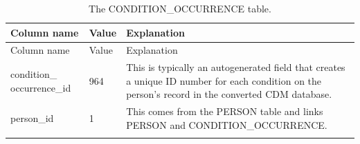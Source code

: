 \documentclass[11pt]{book}
\begin{document}
\begin{longtable}[]{@{}lll@{}}
\caption{\label{tab:conditionOccurrence} The CONDITION\_OCCURRENCE
table.}\tabularnewline
\toprule
\begin{minipage}[b]{0.28\columnwidth}\raggedright\strut
Column name\strut
\end{minipage} & \begin{minipage}[b]{0.16\columnwidth}\raggedright\strut
Value\strut
\end{minipage} & \begin{minipage}[b]{0.48\columnwidth}\raggedright\strut
Explanation\strut
\end{minipage}\tabularnewline
\midrule
\endfirsthead
\toprule
\begin{minipage}[b]{0.28\columnwidth}\raggedright\strut
Column name\strut
\end{minipage} & \begin{minipage}[b]{0.16\columnwidth}\raggedright\strut
Value\strut
\end{minipage} & \begin{minipage}[b]{0.48\columnwidth}\raggedright\strut
Explanation\strut
\end{minipage}\tabularnewline
\midrule
\endhead
\begin{minipage}[t]{0.28\columnwidth}\raggedright\strut
condition\_ occurrence\_id\strut
\end{minipage} & \begin{minipage}[t]{0.16\columnwidth}\raggedright\strut
964\strut
\end{minipage} & \begin{minipage}[t]{0.48\columnwidth}\raggedright\strut
This is typically an autogenerated field that creates a unique ID number
for each condition on the person's record in the converted CDM
database.\strut
\end{minipage}\tabularnewline
\begin{minipage}[t]{0.28\columnwidth}\raggedright\strut
person\_id\strut
\end{minipage} & \begin{minipage}[t]{0.16\columnwidth}\raggedright\strut
1\strut
\end{minipage} & \begin{minipage}[t]{0.48\columnwidth}\raggedright\strut
This comes from the PERSON table and links PERSON and
CONDITION\_OCCURRENCE.\strut
\end{minipage}\tabularnewline
\begin{minipage}[t]{0.28\columnwidth}\raggedright\strut

\end{minipage}
\end{longtable}
\end{document}
